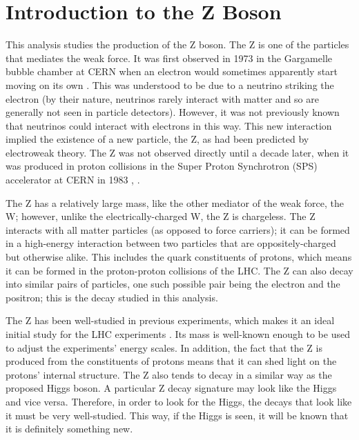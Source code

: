 


\section{Introduction to the Z Boson}
This analysis studies the production of the Z boson.  
The Z is one of the particles that mediates the weak force.  
It was first observed in 1973 in the Gargamelle bubble chamber at CERN 
when an electron would sometimes apparently start moving on its own 
\cite{NC-Gargamelle}.  
This was understood to be due to a neutrino striking the electron 
(by their nature, neutrinos rarely interact with matter and so are generally 
not seen in particle detectors).  
However, it was not previously known that neutrinos could interact 
with electrons in this way.  
This new interaction implied the existence of a new particle, the Z, 
as had been predicted by electroweak theory.  
The Z was not observed directly until a decade later, 
when it was produced in proton collisions in the 
Super Proton Synchrotron (SPS) accelerator at CERN in 1983 
\cite{Z-ua1}, \cite{Z-ua2}.  

The Z has a relatively large mass, 
like the other mediator of the weak force, the W; 
however, unlike the electrically-charged W, the Z is chargeless.  
The Z interacts with all matter particles (as opposed to force carriers); 
it can be formed in a high-energy interaction between 
two particles that are oppositely-charged but otherwise alike.  
This includes the quark constituents of protons, 
which means it can be formed in the proton-proton collisions 
of the LHC.  
The Z can also decay into similar pairs of particles, 
one such possible pair being the electron and the positron; 
this is the decay studied in this analysis.  

The Z has been well-studied in previous experiments, 
which makes it an ideal initial study for the LHC experiments 
\cite{PhysicsTdr}.  
Its mass is well-known enough to be used to 
adjust the experiments' energy scales.  
In addition, the fact that the Z is produced from the 
constituents of protons 
means that it can shed light on the protons' internal structure.   
The Z also tends to decay in a similar way as the 
proposed Higgs boson. %
A particular Z decay signature may 
look like the Higgs and vice versa.  
Therefore, in order to look for the Higgs, 
the decays that look like it must be very well-studied.  
This way, if the Higgs is seen, 
it will be known that it is definitely something new.  


